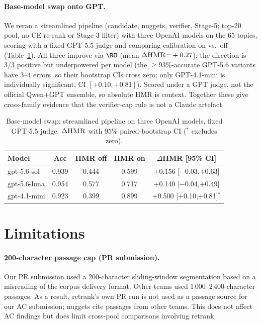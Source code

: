 \documentclass[11pt,a4paper]{article}
\newcommand{\HMR}{\textsc{HMR}}
\begin{document}
\paragraph{Base-model swap onto GPT.} We reran a streamlined pipeline (candidate, nuggets,
verifier, Stage-5; top-20 pool, no CE re-rank or Stage-3 filter) with three OpenAI models on
the 65 topics, scoring with a fixed GPT-5.5 judge and comparing calibration on vs.\ off
(Table~\ref{tab:gptswap}). All three improve via $\RO$ (mean $\Delta\HMR{=}+0.27$); the
direction is 3/3 positive but underpowered per model (the $\ge93\%$-accurate GPT-5.6 variants
have $3$--$4$ errors, so their bootstrap CIs cross zero; only GPT-4.1-mini is individually
significant, CI $[+0.10,+0.81]$). Scored under a GPT judge, not the official Qwen$+$GPT
ensemble, so absolute \HMR{} is context. Together these give cross-family evidence that the
verifier-cap rule is not a Claude artefact.

\begin{table}[t]
\centering\small
\caption{Base-model swap: streamlined pipeline on three OpenAI models, fixed GPT-5.5 judge.
$\Delta\HMR{}$ with $95\%$ paired-bootstrap CI ($^\ast$ excludes zero).}
\label{tab:gptswap}
\begin{tabular}{lcccc}
\toprule
Model & Acc & \HMR{} off & \HMR{} on & $\Delta$\HMR{} [95\% CI] \\
\midrule
gpt-5.6-sol  & 0.939 & 0.444 & 0.599 & $+$0.156 [$-$0.03,$+$0.63] \\
gpt-5.6-luna & 0.954 & 0.577 & 0.717 & $+$0.140 [$-$0.04,$+$0.49] \\
gpt-4.1-mini & 0.923 & 0.399 & 0.899 & $+$0.500 [$+$0.10,$+$0.81]$^\ast$ \\
\bottomrule
\end{tabular}
\end{table}

\section{Limitations}\label{sec:limitations}

\paragraph{200-character passage cap (PR submission).}
Our PR submission used a 200-character sliding-window segmentation
based on a misreading of the corpus delivery format. Other teams
used 1\,000–2\,400-character passages. As a result, retrank's own
PR run is not used as a passage source for our AC submission;
nuggets cite passages from other teams. This does not affect AC
findings but does limit cross-pool comparisons involving retrank.
\end{document}
